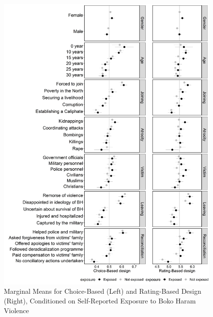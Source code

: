 \begin{figure}[H]
\includegraphics[width=\textwidth]{Chapter_3/art2-figure5.jpeg}
\caption{Marginal Means for Choice-Based (Left) and Rating-Based Design (Right), Conditioned on Self-Reported Exposure to Boko Haram Violence}
\label{fig:art2-fig5}    
\end{figure}


